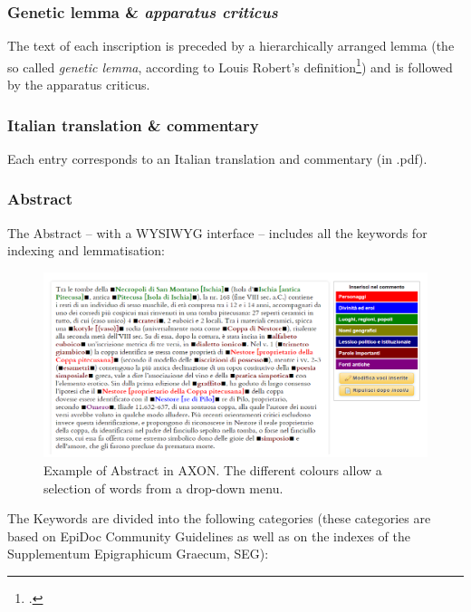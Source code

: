\documentclass[amsthm,ebook]{saparticle}
\begin{document}
\subsubsection{Genetic lemma \& \emph{apparatus criticus}}


\noindent The text of each inscription is preceded by a hierarchically arranged lemma (the so called \emph{genetic lemma}, according to
Louis Robert’s definition\footnote{\citet{robert_carie:_1954}.}) and is followed by the apparatus criticus.




\subsubsection{Italian translation \& commentary}


\noindent Each entry corresponds to an Italian translation and commentary (in .pdf). 




\subsubsection{Abstract}


\noindent The Abstract – with a WYSIWYG interface – includes all the keywords for indexing and lemmatisation:

\begin{figure}[!hbp]
\centering
 \includegraphics[width=\columnwidth]{Fig2.png}
\caption{Example of Abstract in AXON. The different colours allow a selection of words from a drop-down menu. }
\label{fig:2}
\end{figure}




The Keywords are divided into the following categories (these categories are based on EpiDoc Community Guidelines as
well as on the indexes of the Supplementum Epigraphicum Graecum, SEG):
\end{document}
